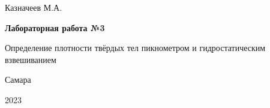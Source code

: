 \begin{titlepage}
	\begin{center}
		\Large{Казначеев М.А.}
	\end{center}
	\vspace*{\fill}
	\begin{center}
		\LARGE\textbf{Лабораторная работа №3}
		
		\addvspace{1em}
		
		\Large{Определение плотности твёрдых тел пикнометром и гидростатическим взвешиванием}
		
	\end{center}
	\vspace*{\fill}
	\begin{center}
		\large{Самара}
		
		\large{2023}
	\end{center}
\end{titlepage}